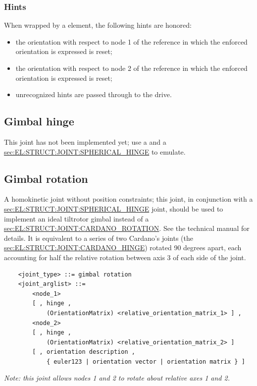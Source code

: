 \subsubsection{Hints}
When wrapped by a  element, the following hints are honored:
\begin{itemize}
\item {} the orientation with respect to node 1
of the reference in which the enforced orientation is expressed is reset;
\item {} the orientation with respect to node 2
of the reference in which the enforced orientation is expressed is reset;
\item unrecognized hints are passed through to the  drive.
\end{itemize}

\subsection{Gimbal hinge}
This joint has not been implemented yet; use a 
and a
\hyperref{\kw{spherical hinge}}{\kw{spherical hinge} (see Section~}{)}{sec:EL:STRUCT:JOINT:SPHERICAL_HINGE}
to emulate.

\subsection{Gimbal rotation}\label{sec:EL:JOINT:GIMBALROTATION}
A homokinetic joint without position constraints;
this joint, in conjunction with a
\hyperref{\kw{spherical hinge}}{\kw{spherical hinge} (see Section~}{)}{sec:EL:STRUCT:JOINT:SPHERICAL_HINGE}
joint, should be used to implement an ideal tiltrotor gimbal
instead of a
\hyperref{\kw{cardano rotation}}{\kw{cardano rotation} (see Section~}{)}{sec:EL:STRUCT:JOINT:CARDANO_ROTATION}.
See the technical manual for details.
It is equivalent to a series of two Cardano's joints
(the \hyperref{\kw{cardano hinge}}{\kw{cardano hinge}, see Section~}{}{sec:EL:STRUCT:JOINT:CARDANO_HINGE})
rotated 90 degrees apart, each accounting for half the relative rotation
between axis 3 of each side of the joint.
\begin{verbatim}
    <joint_type> ::= gimbal rotation
    <joint_arglist> ::= 
        <node_1>
        [ , hinge , 
            (OrientationMatrix) <relative_orientation_matrix_1> ] ,
        <node_2>
        [ , hinge , 
            (OrientationMatrix) <relative_orientation_matrix_2> ]
        [ , orientation description ,
            { euler123 | orientation vector | orientation matrix } ]
\end{verbatim}
{\em
    Note: this joint allows nodes 1 and 2 to rotate about relative 
    axes 1 and 2.
}

